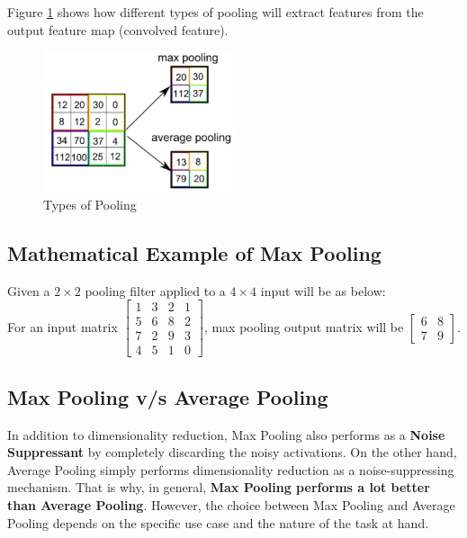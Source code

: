 Figure \ref{fig:12} shows how different types of pooling will extract features from the output feature map (convolved feature).

\begin{figure}[h!]
    \centering
    \includegraphics[width=0.5\textwidth]{images/figure12.png}
    \caption{Types of Pooling}
    \label{fig:12}
\end{figure}

\subsection{Mathematical Example of Max Pooling}
Given a $2\times2$ pooling filter applied to a $4\times4$ input will be as below:\\

For an input matrix
$\begin{bmatrix} 1 & 3 & 2 & 1\\ 5 & 6 & 8 & 2\\ 7 & 2 & 9 & 3\\ 4 & 5 & 1 & 0
\end{bmatrix}$, max pooling output matrix will be $\begin{bmatrix} 6 & 8\\ 7 & 9\end{bmatrix}$.

\subsection{Max Pooling v/s Average Pooling}
In addition to dimensionality reduction, Max Pooling also performs as a \textbf{Noise Suppressant} by completely discarding the noisy activations. On the other hand, Average Pooling simply performs dimensionality reduction as a noise-suppressing mechanism. That is why, in general, \textbf{Max Pooling performs a lot better than Average Pooling}. However, the choice between Max Pooling and Average Pooling depends on the specific use case and the nature of the task at hand.\\

